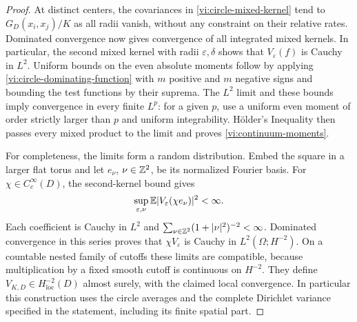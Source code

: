 \begin{proof}
At distinct centers, the covariances in
\eqref{vi:circle-mixed-kernel} tend to $G_D(x_i,x_j)/K$ as all radii
vanish, without any constraint on their relative rates.
Dominated convergence now gives convergence of all integrated mixed
kernels.  In particular, the second mixed kernel with radii
$\varepsilon,\delta$ shows that $V_\varepsilon(f)$ is Cauchy in $L^2$.
Uniform bounds on the even absolute moments follow by applying
\eqref{vi:circle-dominating-function} with $m$ positive and $m$ negative
signs and bounding the test functions by their suprema.
The $L^2$ limit and these bounds imply convergence in every finite $L^p$:
for a given $p$, use a uniform even moment of order strictly larger than
$p$ and uniform integrability.  H\"older's Inequality then passes every
mixed product to the limit and proves \eqref{vi:continuum-moments}.

For completeness, the limits form a random distribution.  Embed the square
in a larger flat torus and let $e_\nu$, $\nu\in\mathbb Z^2$, be its normalized
Fourier basis.  For $\chi\in C_c^\infty(D)$, the second-kernel bound gives
\[
 \sup_{\varepsilon,\nu}\mathbb E|V_\varepsilon(\chi e_\nu)|^2<\infty.
\]
Each coefficient is Cauchy in $L^2$ and
$\sum_{\nu\in\mathbb Z^2}(1+|\nu|^2)^{-2}<\infty$.
Dominated convergence in this series proves that
$\chi V_\varepsilon$ is Cauchy in $L^2(\Omega;H^{-2})$.
On a countable nested family of cutoffs these limits are compatible,
because multiplication by a fixed smooth cutoff is continuous on $H^{-2}$.
They define $V_{K,D}\in H^{-2}_{\mathrm{loc}}(D)$ almost surely, with the
claimed local convergence.  In particular this construction uses the
circle averages and the complete Dirichlet variance specified in the
statement, including its finite spatial part.
\end{proof}

